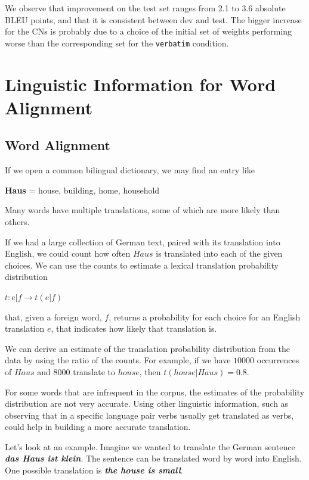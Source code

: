 \documentclass[10pt]{report}
\theoremstyle{plain}
\begin{document}
{We observe that improvement on the test set ranges from 2.1 to 3.6 absolute BLEU points, and that it is consistent between dev and test. The bigger increase for the CNs is probably due to a choice of the initial set of weights performing worse than the corresponding set for the {\tt verbatim} condition.


\section{Linguistic Information for Word Alignment}

\subsection{Word Alignment\\}

If we open a common bilingual dictionary, we may find an entry
like\\
\begin{center}
\textbf{Haus} = house, building, home, household\\
\end{center}
Many words have multiple translations, some of which are more likely
than others.

If we had a large collection of German text, paired with its
translation into English, we could count how often $Haus$ is
translated into each of the given choices. We can use the counts to
estimate a lexical translation probability distribution

\begin{center}
$t : e|f \rightarrow t(e|f)$
\end{center}

that, given a foreign word, $f$, returns a probability for each
choice for an English translation $e$, that indicates how likely
that translation is.


We can derive an estimate of the translation probability
distribution from the data by using the ratio of the counts. For
example, if we have $10000$ occurrences of $Haus$ and $8000$
translate to $house$, then $t(house|Haus)=0.8$.

For some words that are infrequent in the corpus, the estimates of
the probability distribution are not very accurate. Using other
linguistic information, such as observing that in a specific
language pair verbs usually get translated as verbs, could help in
building a more accurate translation.

Let's look at an example. Imagine we wanted to translate the German
sentence \textbf{\emph{das Haus ist klein}}. The sentence can be
translated word by word into English. One possible translation is
\textbf{\emph{the house is small}}.


}
\end{document}
